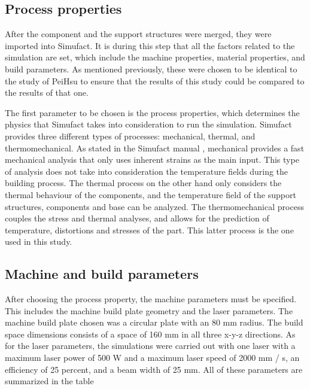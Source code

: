 \documentclass[../main.tex]{subfiles}
\begin{document}

\subsection{Process properties}


After the component and the support structures were merged, they were imported into Simufact. It is during this step that all the factors related to the simulation are set, which include the machine properties, material properties, and build parameters. As mentioned previously, these were chosen to be identical to the study of PeiHsu to ensure that the results of this study could be compared to the results of that one. 

The first parameter to be chosen is the process properties, which determines the physics that Simufact takes into consideration to run the simulation. Simufact provides three different types of processes: mechanical, thermal, and thermomechanical. As stated in the Simufact manual , mechanical provides a fast mechanical analysis that only uses inherent strains as the main input. This type of analysis does not take into consideration the temperature fields during the building process. The thermal process on the other hand only considers the thermal behaviour of the components, and the temperature field of the support structures, components and base can be analyzed. The thermomechanical process couples the stress and thermal analyses, and allows for the prediction of temperature, distortions and stresses of the part. This latter process is the one used in this study.

\subsection{Machine and build parameters}

After choosing the process property, the machine parameters must be specified. This includes the machine build plate geometry and the laser parameters. The machine build plate chosen was a circular plate with an 80 mm radius. The build space dimensions consists of a space of 160 mm in all three x-y-z directions. As for the laser parameters, the simulations were carried out with one laser with a maximum laser power of 500 W and a maximum laser speed of 2000 mm / s, an efficiency of 25 percent, and a beam width of 25 mm. All of these parameters are summarized in the table 
\end{document}

